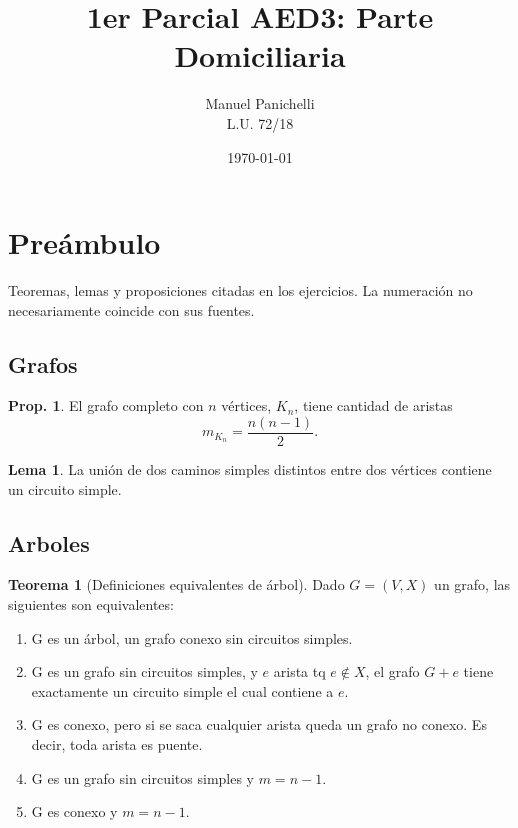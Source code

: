 \documentclass[12pt, a4paper]{report}
\title{1er Parcial AED3: Parte Domiciliaria}
\author{Manuel Panichelli\\L.U. 72/18}
\date{\today}
\theoremstyle{definition} %
\newtheorem{theorem}{Teorema}
\newtheorem{lemma}{Lema}
\newtheorem{proposition}{Prop.}
\begin{document}
\maketitle
\thispagestyle{fancyplain}
\newpage

\chapter*{Preámbulo}

Teoremas, lemas y proposiciones citadas en los ejercicios. La numeración no necesariamente coincide con sus fuentes.

\section*{Grafos}

\begin{proposition}\label{grafos/k_n}
    El grafo completo con $n$ vértices, $K_n$, tiene cantidad de aristas
    \[ m_{K_n} = \frac{n(n-1)}{2}. \]
\end{proposition}

\begin{lemma}\label{grafos/union-caminos}
    La unión de dos caminos simples distintos entre dos vértices contiene un circuito simple.
\end{lemma}

\section*{Arboles}

\begin{theorem}[Definiciones equivalentes de árbol]\label{teo:tree-equiv}
    Dado $G = (V, X)$ un grafo, las siguientes son equivalentes:

    \begin{enumerate}
        \item G es un árbol, un grafo conexo sin circuitos simples.
        \item G es un grafo sin circuitos simples, y $e$ arista tq $e \notin X$,
        el grafo $G + e$ tiene exactamente un circuito simple el cual contiene a
        $e$.\label{teo:tree-equiv-circ}
        \item G es conexo, pero si se saca cualquier arista queda un grafo no
        conexo. Es decir, toda arista es puente.\label{teo:tree-equiv-puentes}

        \item G es un grafo sin circuitos simples y $m=n-1$.
        \item G es conexo y $m=n-1$.\label{teo:tree/equiv/conexo-n-1}
    \end{enumerate}
\end{theorem}
\end{document}
